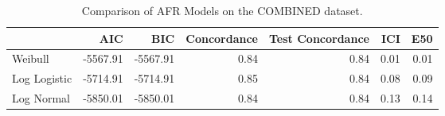 \begin{table*}
\centering
\caption{Comparison of AFR Models on the COMBINED dataset.}
\label{tab:combined}
\begin{tabular}{lrrrrrr}
\toprule
 & AIC & BIC & Concordance & Test Concordance & ICI & E50 \\
\midrule
Weibull & -5567.91 & -5567.91 & 0.84 & 0.84 & 0.01 & 0.01 \\
Log Logistic & -5714.91 & -5714.91 & 0.85 & 0.84 & 0.08 & 0.09 \\
Log Normal & -5850.01 & -5850.01 & 0.84 & 0.84 & 0.13 & 0.14 \\
\bottomrule
\end{tabular}
\end{table*}
